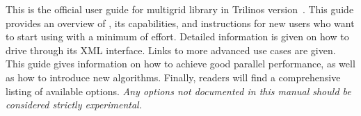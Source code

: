 
This is the official user guide for \muelu{} multigrid library in Trilinos
version~. This guide provides an overview of \muelu, its capabilities, and
instructions for new users who want to start using \muelu{} with a minimum of
effort. Detailed information is given on how to drive \muelu{} through its XML
interface. Links to more advanced use cases are given. This guide gives
information on how to achieve good parallel performance, as well as how to
introduce new algorithms. Finally, readers will find a comprehensive listing of
available \muelu{} options.  {\em Any options not documented in this manual
should be considered strictly experimental.}

